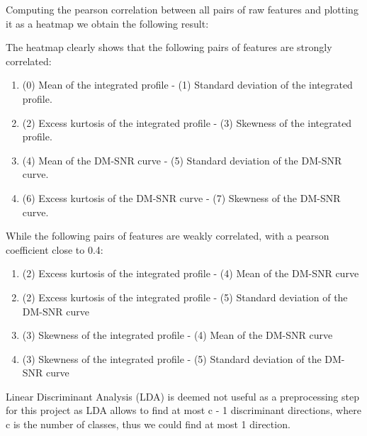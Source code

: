 \documentclass[12pt,a4paper]{article}
\begin{document}
Computing the pearson correlation between all pairs of raw features and plotting it as a heatmap we obtain the following result:
\begin{figure}[H]
    \begin{center}
    \end{center}
\end{figure}
The heatmap clearly shows that the following pairs of features are strongly correlated:
\begin{enumerate}
    \item (0) Mean of the integrated profile - (1) Standard deviation of the integrated profile.
    \item (2) Excess kurtosis of the integrated profile - (3) Skewness of the integrated profile.
    \item (4) Mean of the DM-SNR curve - (5) Standard deviation of the DM-SNR curve.
    \item (6) Excess kurtosis of the DM-SNR curve - (7) Skewness of the DM-SNR curve.
\end{enumerate}

While the following pairs of features are weakly correlated, with a pearson coefficient close to 0.4:
\begin{enumerate}
    \item (2) Excess kurtosis of the integrated profile - (4) Mean of the DM-SNR curve
    \item (2) Excess kurtosis of the integrated profile - (5) Standard deviation of the DM-SNR curve
    \item (3) Skewness of the integrated profile - (4) Mean of the DM-SNR curve
    \item (3) Skewness of the integrated profile - (5) Standard deviation of the DM-SNR curve
\end{enumerate}
\clearpage





Linear Discriminant Analysis (LDA) is deemed not useful as a preprocessing step for this project as LDA allows to find at most c - 1 discriminant directions, where c is the number of classes, thus we could find at most 1 direction.
\end{document}
